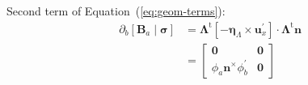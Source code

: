 Second term of Equation~(\ref{eq:geom-terms}): %
\begin{equation} 
     \begin{aligned}
     \partial_b\left[\bm{B}_a\mid\bm{\sigma}\right]
     &=    \bm{\Lambda}^{\mathrm{t}}\left[-\bm{\eta}_{\scriptscriptstyle{\Lambda}} \times \bm{u}_x^{\prime}\right] \cdot \bm{\Lambda}^{\mathrm{t}}\bm{n}  \\
     &=  \left[\begin{array}{cc}
     \mathbf{0} & \mathbf{0} \\
     \phi_a \bm{n}^{\times} \phi_b^\prime & \mathbf{0}
     \end{array}\right]
     \end{aligned}
     \label{eq:G2-svq}
\end{equation}


